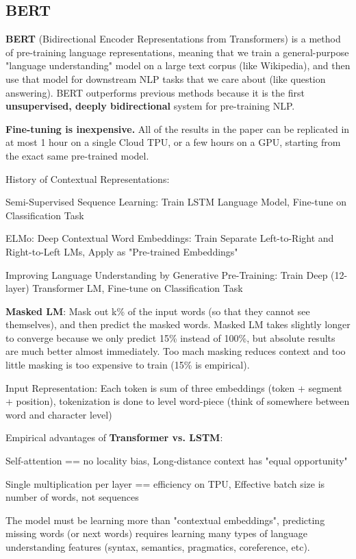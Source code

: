 \documentclass[12pt]{article}
\begin{document}
\subsection{BERT}
\par \textbf{BERT} (Bidirectional Encoder Representations from Transformers) is a method of pre-training language representations, meaning that we train a general-purpose "language understanding" model on a large text corpus (like Wikipedia), and then use that model for downstream NLP tasks that we care about (like question answering). BERT outperforms previous methods because it is the first \textbf{unsupervised, deeply bidirectional} system for pre-training NLP.
\par \textbf{Fine-tuning is inexpensive.} All of the results in the paper can be replicated in at most 1 hour on a single Cloud TPU, or a few hours on a GPU, starting from the exact same pre-trained model. 
\par History of Contextual Representations:
\ulb
\item Semi-Supervised Sequence Learning: Train LSTM Language Model, Fine-tune on Classification Task
\item ELMo: Deep Contextual Word Embeddings: Train Separate Left-to-Right and Right-to-Left LMs, Apply as "Pre-trained Embeddings"
\item Improving Language Understanding by Generative Pre-Training: Train Deep (12-layer) Transformer LM, Fine-tune on Classification Task
\ule
\par \textbf{Masked LM}: Mask out k\% of the input words (so that they cannot see themselves), and then predict the masked words. Masked LM takes slightly longer to converge because we only predict 15\% instead of 100\%, but absolute results are much better almost immediately. Too mach masking reduces context and too little masking is too expensive to train (15\% is empirical).
\par Input Representation: Each token is sum of three embeddings (token + segment + position), tokenization is done to level word-piece (think of somewhere between word and character level)
\par Empirical advantages of \textbf{Transformer vs. LSTM}:
\ulb
\item Self-attention == no locality bias, Long-distance context has "equal opportunity"
\item Single multiplication per layer == efficiency on TPU, Effective batch size is number of words, not sequences
\ule
\par The model must be learning more than "contextual embeddings", predicting missing words (or next words) requires learning many types of language understanding features (syntax, semantics, pragmatics, coreference, etc).
\end{document}
